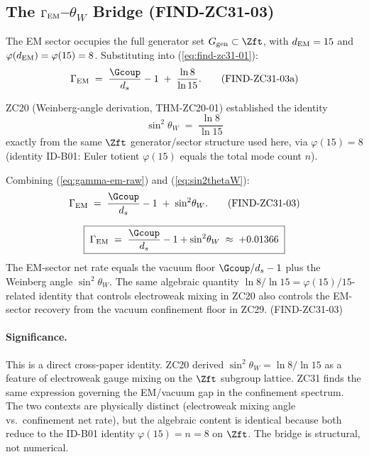 \documentclass[12pt, a4paper]{article}
\begin{document}
\subsection{The $\Gamma_{\rm EM}$--$\theta_W$ Bridge (FIND-ZC31-03)}
\label{sec:em-thetaw-bridge}

The EM sector occupies the full generator set $G_{\rm gen} \subset
\Zft$, with $d_{\rm EM} = 15$ and
$\varphi(d_{\rm EM}) = \varphi(15) = 8$. Substituting into
(\ref{eq:find-zc31-01}):
\begin{equation}
  \Gamma_{\rm EM}
    \;=\; \frac{\Gcoup}{d_s} - 1
    \;+\; \frac{\ln 8}{\ln 15}.
  \tag{FIND-ZC31-03a}\label{eq:gamma-em-raw}
\end{equation}

ZC20 (Weinberg-angle derivation, THM-ZC20-01) established the
identity
\begin{equation}
  \sin^2\!\theta_W \;=\; \frac{\ln 8}{\ln 15}
  \tag{THM-ZC20-01 recalled}\label{eq:sin2thetaW}
\end{equation}
exactly from the same $\Zft$ generator/sector structure used
here, via $\varphi(15) = 8$ (identity ID-B01: Euler totient
$\varphi(15)$ equals the total mode count $n$).

Combining (\ref{eq:gamma-em-raw}) and (\ref{eq:sin2thetaW}):
\begin{equation}
  \Gamma_{\rm EM}
    \;=\; \frac{\Gcoup}{d_s} - 1
    \;+\; \sin^2\!\theta_W.
  \tag{FIND-ZC31-03}\label{eq:find-zc31-03}
\end{equation}

\begin{derivedbox}[title={FIND-ZC31-03: The $\Gamma_{\rm EM}$
  -- $\theta_W$ bridge (exact)}]
\[
  \boxed{\;\Gamma_{\rm EM}
    \;=\; \frac{\Gcoup}{d_s} - 1 + \sin^2\!\theta_W
    \;\approx\; +0.01366\;}
\]
The EM-sector net rate equals the vacuum floor
$\Gcoup/d_s - 1$ plus the Weinberg angle $\sin^2\!\theta_W$.
The same algebraic quantity $\ln 8/\ln 15 = \varphi(15)/15$-related
identity that controls electroweak mixing in ZC20 also controls
the EM-sector recovery from the vacuum confinement floor in
ZC29.
\hfill\textup{(FIND-ZC31-03)}
\end{derivedbox}

\paragraph{Significance.}
This is a direct cross-paper identity. ZC20 derived
$\sin^2\!\theta_W = \ln 8/\ln 15$ as a feature of electroweak
gauge mixing on the $\Zft$ subgroup lattice. ZC31 finds the
same expression governing the EM/vacuum gap in the confinement
spectrum. The two contexts are physically distinct
(electroweak mixing angle vs.\ confinement net rate), but the
algebraic content is identical because both reduce to the
ID-B01 identity $\varphi(15) = n = 8$ on $\Zft$. The bridge
is structural, not numerical.
\end{document}
